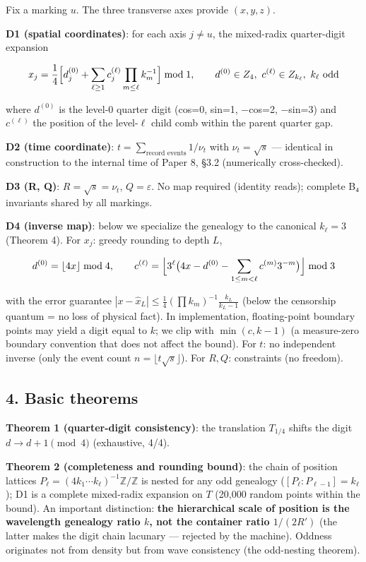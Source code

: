\documentclass[
]{article}
\begin{document}
Fix a marking \(u\). The three transverse axes provide \((x,y,z)\).

\textbf{D1 (spatial coordinates)}: for each axis \(j\neq u\), the
mixed-radix quarter-digit expansion

\[
x_j=\frac{1}{4}\Bigl[d_j^{(0)}+\sum_{\ell\ge1}c_j^{(\ell)}\prod_{m\le\ell}k_m^{-1}\Bigr]\bmod 1,
\qquad d^{(0)}\in Z_4,\ c^{(\ell)}\in Z_{k_\ell},\ k_\ell\ \text{odd}
\]

where \(d^{(0)}\) is the level-0 quarter digit (cos=0, sin=1, −cos=2,
−sin=3) and \(c^{(\ell)}\) the position of the level-\(\ell\) child comb
within the parent quarter gap.

\textbf{D2 (time coordinate)}: \(t=\sum_{\text{record events}}1/\nu_t\)
with \(\nu_t=\sqrt{s}\) --- identical in construction to the internal
time of Paper 8, §3.2 (numerically cross-checked).

\textbf{D3 (R, Q)}: \(R=\sqrt{s}=\nu_t\), \(Q=\varepsilon\). No map
required (identity reads); complete B₄ invariants shared by all
markings.

\textbf{D4 (inverse map)}: below we specialize the genealogy to the
canonical \(k_\ell=3\) (Theorem 4). For \(x_j\): greedy rounding to
depth \(L\),

\[
d^{(0)}=\lfloor4x\rfloor\bmod4,\qquad
c^{(\ell)}=\Bigl\lfloor 3^{\ell}\bigl(4x-d^{(0)}-\sum_{1\le m<\ell}c^{(m)}3^{-m}\bigr)\Bigr\rfloor\bmod 3
\]

with the error guarantee
\(|x-\hat x_L|\le\frac14(\prod k_m)^{-1}\frac{k_L}{k_L-1}\) (below the
censorship quantum = no loss of physical fact). In implementation,
floating-point boundary points may yield a digit equal to \(k\); we clip
with \(\min(c,k{-}1)\) (a measure-zero boundary convention that does not
affect the bound). For \(t\): no independent inverse (only the event
count \(n=\lfloor t\sqrt s\rfloor\)). For \(R,Q\): constraints (no
freedom).

\subsection{4. Basic theorems}\label{basic-theorems}

\textbf{Theorem 1 (quarter-digit consistency)}: the translation
\(T_{1/4}\) shifts the digit \(d\to d+1\pmod4\) (exhaustive, 4/4).

\textbf{Theorem 2 (completeness and rounding bound)}: the chain of
position lattices
\(P_\ell=(4k_1\cdots k_\ell)^{-1}\mathbb{Z}/\mathbb{Z}\) is nested for
any odd genealogy (\([P_\ell:P_{\ell-1}]=k_\ell\)); D1 is a complete
mixed-radix expansion on \(T\) (20,000 random points within the bound).
An important distinction: \textbf{the hierarchical scale of position is
the wavelength genealogy ratio \(k\), not the container ratio
\(1/(2R')\)} (the latter makes the digit chain lacunary --- rejected by
the machine). Oddness originates not from density but from wave
consistency (the odd-nesting theorem).
\end{document}

